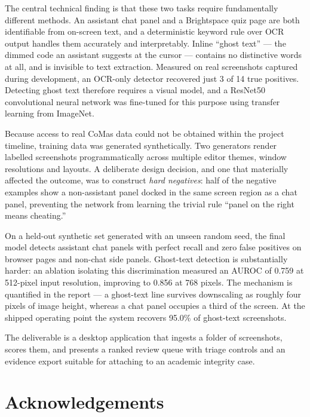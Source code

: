 \documentclass[12pt,oneside]{report}
\begin{document}
The central technical finding is that these two tasks require fundamentally
different methods. An assistant chat panel and a Brightspace quiz page are both
identifiable from on-screen text, and a deterministic keyword rule over OCR
output handles them accurately and interpretably. Inline ``ghost text'' --- the
dimmed code an assistant suggests at the cursor --- contains no distinctive
words at all, and is invisible to text extraction. Measured on real screenshots
captured during development, an OCR-only detector recovered just 3 of 14 true
positives. Detecting ghost text therefore requires a visual model, and a
ResNet50 convolutional neural network was fine-tuned for this purpose using
transfer learning from ImageNet.

Because access to real CoMas data could not be obtained within the project
timeline, training data was generated synthetically. Two generators render
labelled screenshots programmatically across multiple editor themes, window
resolutions and layouts. A deliberate design decision, and one that materially
affected the outcome, was to construct \emph{hard negatives}: half of the
negative examples show a non-assistant panel docked in the same screen region
as a chat panel, preventing the network from learning the trivial rule
``panel on the right means cheating.''

On a held-out synthetic set generated with an unseen random seed, the final
model detects assistant chat panels with perfect recall and zero false
positives on browser pages and non-chat side panels. Ghost-text detection is
substantially harder: an ablation isolating this discrimination measured an
AUROC of 0.759 at 512-pixel input resolution, improving to 0.856 at 768 pixels.
The mechanism is quantified in the report --- a ghost-text line survives
downscaling as roughly four pixels of image height, whereas a chat panel
occupies a third of the screen. At the shipped operating point the system
recovers 95.0\% of ghost-text screenshots.

The deliverable is a desktop application that ingests a folder of screenshots,
scores them, and presents a ranked review queue with triage controls and an
evidence export suitable for attaching to an academic integrity case.

\chapter*{Acknowledgements}
\end{document}
